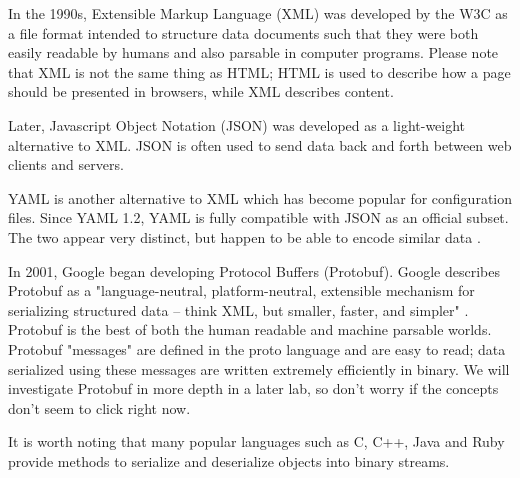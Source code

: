 In the 1990s, Extensible Markup Language (XML) was developed by the W3C as a file format intended to structure data documents such that they were both easily readable by humans and also parsable in computer programs. Please note that XML is not the same thing as HTML; HTML is used to describe how a page should be presented in browsers, while XML describes content.

Later, Javascript Object Notation (JSON) was developed as a light-weight alternative to XML. JSON is often used to send data back and forth between web clients and servers.

YAML is another alternative to XML which has become popular for configuration files. Since YAML 1.2, YAML is fully compatible with JSON as an official subset. The two appear very distinct, but happen to be able to encode similar data \cite{ben-kiki_evans_net_2009}. 

In 2001, Google began developing Protocol Buffers (Protobuf). Google describes Protobuf as a "language-neutral, platform-neutral, extensible mechanism for serializing structured data – think XML, but smaller, faster, and simpler" \cite{google_protobuf}. Protobuf is the best of both the human readable and machine parsable worlds. Protobuf "messages" are defined in the proto language and are easy to read; data serialized using these messages are written extremely efficiently in binary. We will investigate Protobuf in more depth in a later lab, so don't worry if the concepts don't seem to click right now.

It is worth noting that many popular languages such as C, C++, Java and Ruby provide methods to serialize and deserialize objects into binary streams. 






